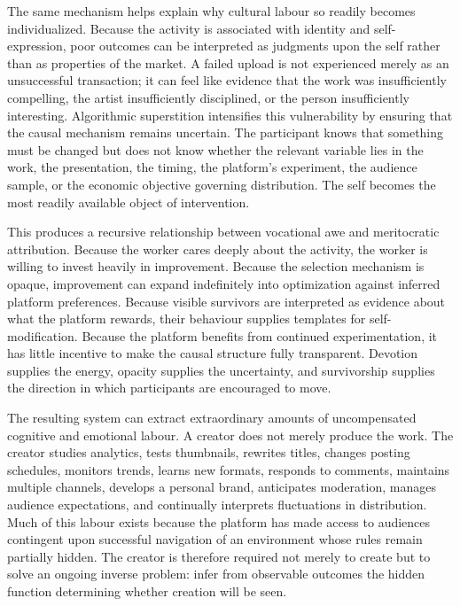 \documentclass[11pt]{article}
\begin{document}
The same mechanism helps explain why cultural labour so readily becomes individualized. Because the activity is associated with identity and self-expression, poor outcomes can be interpreted as judgments upon the self rather than as properties of the market. A failed upload is not experienced merely as an unsuccessful transaction; it can feel like evidence that the work was insufficiently compelling, the artist insufficiently disciplined, or the person insufficiently interesting. Algorithmic superstition intensifies this vulnerability by ensuring that the causal mechanism remains uncertain. The participant knows that something must be changed but does not know whether the relevant variable lies in the work, the presentation, the timing, the platform's experiment, the audience sample, or the economic objective governing distribution. The self becomes the most readily available object of intervention.

This produces a recursive relationship between vocational awe and meritocratic attribution. Because the worker cares deeply about the activity, the worker is willing to invest heavily in improvement. Because the selection mechanism is opaque, improvement can expand indefinitely into optimization against inferred platform preferences. Because visible survivors are interpreted as evidence about what the platform rewards, their behaviour supplies templates for self-modification. Because the platform benefits from continued experimentation, it has little incentive to make the causal structure fully transparent. Devotion supplies the energy, opacity supplies the uncertainty, and survivorship supplies the direction in which participants are encouraged to move.

The resulting system can extract extraordinary amounts of uncompensated cognitive and emotional labour. A creator does not merely produce the work. The creator studies analytics, tests thumbnails, rewrites titles, changes posting schedules, monitors trends, learns new formats, responds to comments, maintains multiple channels, develops a personal brand, anticipates moderation, manages audience expectations, and continually interprets fluctuations in distribution. Much of this labour exists because the platform has made access to audiences contingent upon successful navigation of an environment whose rules remain partially hidden. The creator is therefore required not merely to create but to solve an ongoing inverse problem: infer from observable outcomes the hidden function determining whether creation will be seen.
\end{document}
